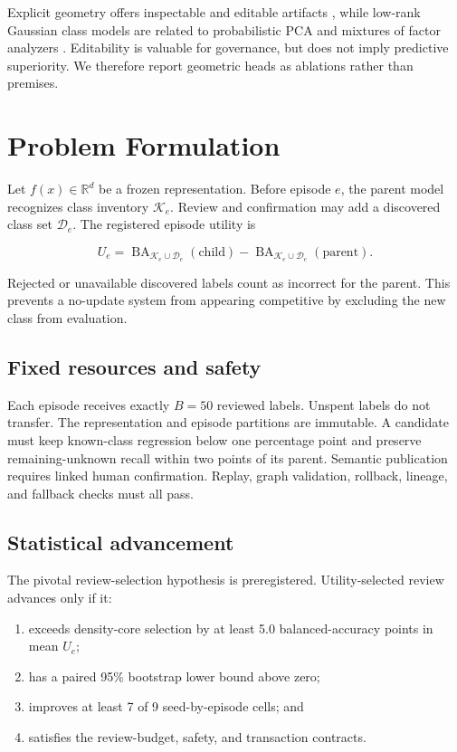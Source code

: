\documentclass[10pt]{article}
\newcommand{\ba}{\operatorname{BA}}
\newcommand{\utility}{U}
\begin{document}
Explicit geometry offers inspectable and editable artifacts
\cite{requicha1980,park2019}, while low-rank Gaussian class models are related
to probabilistic PCA and mixtures of factor analyzers
\cite{tipping1999,ghahramani1996}. Editability is valuable for governance, but
does not imply predictive superiority. We therefore report geometric heads as
ablations rather than premises.

\section{Problem Formulation}

Let $f(x)\in\mathbb{R}^d$ be a frozen representation. Before episode $e$, the
parent model recognizes class inventory $\mathcal{K}_e$. Review and
confirmation may add a discovered class set $\mathcal{D}_e$. The registered
episode utility is

\begin{equation}
\utility_e =
\ba_{\mathcal{K}_e\cup\mathcal{D}_e}(\text{child})
-
\ba_{\mathcal{K}_e\cup\mathcal{D}_e}(\text{parent}).
\label{eq:utility}
\end{equation}

Rejected or unavailable discovered labels count as incorrect for the parent.
This prevents a no-update system from appearing competitive by excluding the
new class from evaluation.

\subsection{Fixed resources and safety}

Each episode receives exactly $B=50$ reviewed labels. Unspent labels do not
transfer. The representation and episode partitions are immutable. A candidate
must keep known-class regression below one percentage point and preserve
remaining-unknown recall within two points of its parent. Semantic publication
requires linked human confirmation. Replay, graph validation, rollback,
lineage, and fallback checks must all pass.

\subsection{Statistical advancement}

The pivotal review-selection hypothesis is preregistered. Utility-selected
review advances only if it:

\begin{enumerate}
  \item exceeds density-core selection by at least 5.0 balanced-accuracy points
  in mean $\utility_e$;
  \item has a paired 95\% bootstrap lower bound above zero;
  \item improves at least 7 of 9 seed-by-episode cells; and
  \item satisfies the review-budget, safety, and transaction contracts.
\end{enumerate}
\end{document}
